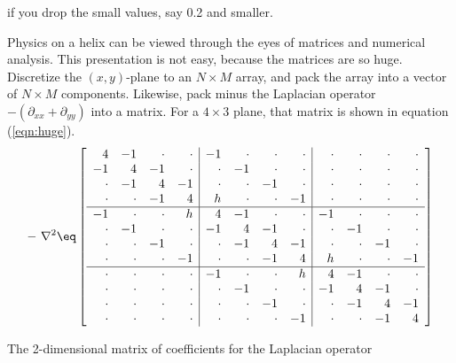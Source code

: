 if you drop the small values, say 0.2 and smaller.
\par
Physics on a helix can be viewed through the eyes
of matrices and numerical analysis.
This presentation is not easy, 
because the matrices are so huge.
Discretize the $(x,y)$-plane to an $N\times M$ array,
and pack the array into a vector of $N\times M$ components.
Likewise, pack minus the Laplacian operator $-(\partial_{xx}+\partial_{yy})$
into a matrix.
For a $4\times 3$ plane, that matrix is shown in equation (\ref{eqn:huge}).
\begin{equation}
\label{eqn:huge}
-\ \nabla^2 \eq
\left[
\begin{array}{rrrr|rrrr|rrrr}
  4 & -1 & \cdot & \cdot 
& -1 & \cdot & \cdot & \cdot 
& \cdot & \cdot & \cdot & \cdot  \\
  -1  &   4  &   -1     &  \cdot 
&  \cdot &-1 & \cdot  & \cdot 
& \cdot  &  \cdot  &  \cdot &  \cdot    \\
\cdot & -1  &   4  & -1  
&  \cdot  &  \cdot &-1  &  \cdot 
&  \cdot  &  \cdot  &  \cdot  &  \cdot   \\
\cdot &  \cdot & -1 &   4  
&  h  &  \cdot  &  \cdot &-1 
&  \cdot  &  \cdot  &  \cdot  &  \cdot  \\
\hline
  -1  &  \cdot  &  \cdot  &  h 
&   4   &  -1   &  \cdot  &  \cdot 
& -1  &  \cdot  &  \cdot &  \cdot 
\\
   \cdot &-1 & \cdot  &  \cdot 
& -1  &   4  &   -1     &  \cdot 
&  \cdot &-1 & \cdot  &  \cdot 
\\
  \cdot  &  \cdot &-1  &  \cdot 
&  \cdot &   -1     &   4   & -1  
& \cdot  &  \cdot &-1  &  \cdot 
\\
  \cdot  &  \cdot  &  \cdot &-1 
& \cdot  &  \cdot  & -1  &   4  
& h  &  \cdot  &  \cdot &-1 
\\
\hline
  \cdot  &  \cdot  &  \cdot  &  \cdot 
& -1  &  \cdot  &  \cdot  &  h 
&   4   &  -1   &  \cdot  &  \cdot 
\\
  \cdot  &  \cdot  &  \cdot  &  \cdot 
&  \cdot &-1 & \cdot  &  \cdot 
& -1  &   4  &   -1     &  \cdot 
\\
  \cdot  &  \cdot  &  \cdot  &  \cdot 
& \cdot  &  \cdot &-1  &  \cdot 
&  \cdot &   -1     &   4   & -1  
\\
  \cdot  &  \cdot  &  \cdot  &  \cdot 
& \cdot  &  \cdot  &  \cdot &-1 
& \cdot  &  \cdot  & -1  &   4  
\end{array}
\right]
\end{equation}
\par\noindent
The 2-dimensional matrix of coefficients for the Laplacian operator
